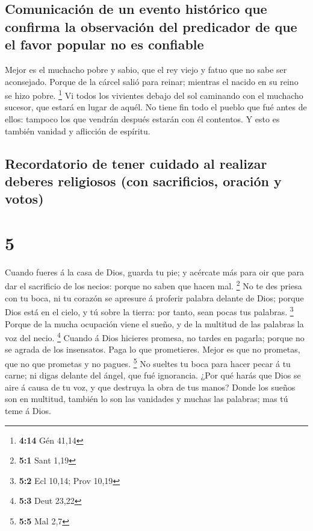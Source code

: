 \hypertarget{comunicaciuxf3n-de-un-evento-histuxf3rico-que-confirma-la-observaciuxf3n-del-predicador-de-que-el-favor-popular-no-es-confiable}{%
\subsection{Comunicación de un evento histórico que confirma la
observación del predicador de que el favor popular no es
confiable}\label{comunicaciuxf3n-de-un-evento-histuxf3rico-que-confirma-la-observaciuxf3n-del-predicador-de-que-el-favor-popular-no-es-confiable}}

 Mejor es el muchacho pobre y sabio, que el rey viejo y
fatuo que no sabe ser aconsejado.  Porque de la cárcel
salió para reinar; mientras el nacido en su reino se hizo pobre.
\footnote{\textbf{4:14} Gén 41,14}  Vi todos los vivientes
debajo del sol caminando con el muchacho sucesor, que estará en lugar de
aquél.  No tiene fin todo el pueblo que fué antes de ellos:
tampoco los que vendrán después estarán con él contentos. Y esto es
también vanidad y aflicción de espíritu.

\hypertarget{recordatorio-de-tener-cuidado-al-realizar-deberes-religiosos-con-sacrificios-oraciuxf3n-y-votos}{%
\subsection{Recordatorio de tener cuidado al realizar deberes religiosos
(con sacrificios, oración y
votos)}\label{recordatorio-de-tener-cuidado-al-realizar-deberes-religiosos-con-sacrificios-oraciuxf3n-y-votos}}

\hypertarget{section-4}{%
\section{5}\label{section-4}}

 Cuando fueres á la casa de Dios, guarda tu pie; y acércate
más para oir que para dar el sacrificio de los necios: porque no saben
que hacen mal. \footnote{\textbf{5:1} Sant 1,19}  No te des
priesa con tu boca, ni tu corazón se apresure á proferir palabra delante
de Dios; porque Dios está en el cielo, y tú sobre la tierra: por tanto,
sean pocas tus palabras. \footnote{\textbf{5:2} Ecl 10,14; Prov 10,19}
 Porque de la mucha ocupación viene el sueño, y de la
multitud de las palabras la voz del necio. \footnote{\textbf{5:3} Deut
  23,22}  Cuando á Dios hicieres promesa, no tardes en
pagarla; porque no se agrada de los insensatos. Paga lo que prometieres.
 Mejor es que no prometas, que no que prometas y no pagues.
\footnote{\textbf{5:5} Mal 2,7}  No sueltes tu boca para
hacer pecar á tu carne; ni digas delante del ángel, que fué ignorancia.
¿Por qué harás que Dios se aire á causa de tu voz, y que destruya la
obra de tus manos?  Donde los sueños son en multitud,
también lo son las vanidades y muchas las palabras; mas tú teme á Dios.

